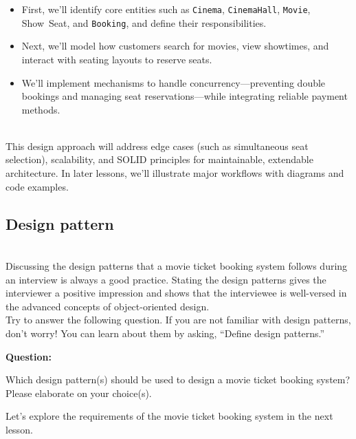 \begin{itemize}
\item
First, we'll identify core entities such as \texttt{Cinema}, \texttt{CinemaHall}, \texttt{Movie}, Show\ Seat, and \texttt{Booking}, and define their responsibilities.
\item
Next, we'll model how customers search for movies, view showtimes, and interact with seating layouts to reserve seats.
\item
We'll implement mechanisms to handle concurrency---preventing double bookings and managing seat reservations---while integrating reliable payment methods.
\end{itemize}
\\
This design approach will address edge cases (such as simultaneous seat selection), scalability, and SOLID principles for maintainable, extendable architecture. In later lessons, we'll illustrate major workflows with diagrams and code examples.

\subsection{Design pattern~}\label{MBdag8LJtJUJiiIih5k4L}
\\
Discussing the design patterns that a movie ticket booking system follows \hspace{0pt}\hspace{0pt} during an interview is always a good practice. Stating the design patterns gives the interviewer a positive impression and shows that the interviewee is well-versed in the advanced concepts of object-oriented design.
\\
Try to answer the following question. If you are not familiar with design patterns, don't worry! You can learn about them by asking, ``Define design patterns.''

\textbf{Question:}

Which design pattern(s) should be used to design a movie ticket booking system? Please elaborate on your choice(s).

Let's explore the requirements of the movie ticket booking system in the next lesson.

